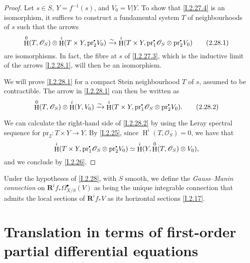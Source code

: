 \documentclass{report}
\theoremstyle{plain}
\theoremstyle{definition}
\newenvironment{env}[1]
    {\renewcommand\theinnercustomenv{#1}\innercustomenv}
    {\endinnercustomenv}
\newcommand{\sh}[1]{{\mathscr{#1}}}
\newcommand{\sbullet}{{\mathbin{\vcenter{\hbox{\scalebox{.5}{$\bullet$}}}}}}
\newcommand{\pr}{\mathrm{pr}}
\newcommand{\RR}{\mathbf{R}}
\DeclareMathOperator{\HH}{H}
\newcommand{\oldpage}[1]{\marginpar{\footnotesize$\Big\vert$ \textit{p.~#1}}}
\begin{document}
\begin{proof}
  Let $s\in S$, $Y=f^{-1}(s)$, and $V_0=V|Y$.
  To show that \cref{I.2.27.4} is an isomorphism, it suffices to construct a fundamental system $T$ of neighbourhoods of $s$ such that the arrows
  \[
  \label{I.2.28.1}
    \HH^0(T,\sh{O}_S) \otimes \HH^i(T\times Y,\pr_2^\sbullet V_0) \xrightarrow{\sim} \HH^i(T\times Y,\pr_1^\sbullet\sh{O}_S \otimes \pr_2^\sbullet V_0)
  \tag{2.28.1}
  \]
  are isomorphisms.
  In fact, the fibre at $s$ of \cref{I.2.27.3}, which is the inductive limit of the arrows \cref{I.2.28.1}, will then be an isomorphism.

  We will prove \cref{I.2.28.1} for a compact Stein neighbourhood $T$ of $s$, assumed to be contractible.
  The arrow in \cref{I.2.28.1} can then be written as
\oldpage{21}
  \[
  \label{I.2.28.2}
    \HH^0(T,\sh{O}_S) \otimes \HH^i(Y,V_0) \xrightarrow{\sim} \HH^i(T\times Y,\pr_1^\sbullet\sh{O}_S \otimes \pr_2^\sbullet V_0).
  \tag{2.28.2}
  \]

  We can calculate the right-hand side of \cref{I.2.28.2} by using the Leray spectral sequence for $\pr_2\colon T\times Y\to Y$.
  By \cref{I.2.25}, since $\HH^i(T,\sh{O}_S)=0$, we have that
  \[
    \HH^i(T\times Y,\pr_1^\sbullet\sh{O}_S \otimes \pr_2^\sbullet V_0) \simeq \HH^i(Y,\HH^0(T,\sh{O}_S) \otimes V_0),
  \]
  and we conclude by \cref{I.2.26}.
\end{proof}

\begin{env}{2.29}
\label{I.2.29}
  Under the hypotheses of \cref{I.2.28}, with $S$ smooth, we define the \emph{Gauss--Manin connection} on $\RR^i f_*\Omega_{X/S}^\bullet(V)$ as being the unique integrable connection that admits the local sections of $\RR^i f_*V$ as its horizontal sections \cref{I.2.17}.
\end{env}



\section{Translation in terms of first-order partial differential equations}
\label{I.3}
\end{document}
